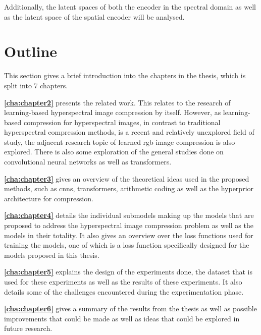 Additionally, the latent spaces of both the encoder in the spectral domain as well as the latent space of the spatial encoder will be analysed.

\section{Outline\label{sec:outline}}
This section gives a brief introduction into the chapters in the thesis, which is split into 7 chapters.

\textbf{\autoref{cha:chapter2}} presents the related work. This relates to the research of learning-based hyperspectral image compression by itself. However, as learning-based compression for hyperspectral images, in contrast to traditional hyperspectral compression methods, is a recent and relatively unexplored field of study, the adjacent research topic of learned \ac{rgb} image compression is also explored. There is also some exploration of the general studies done on convolutional neural networks as well as transformers.

\textbf{\autoref{cha:chapter3}} gives an overview of the theoretical ideas used in the proposed methods, such as \acp{cnn}, transformers, arithmetic coding as well as the hyperprior architecture for compression.

\textbf{\autoref{cha:chapter4}} details the individual submodels making up the models that are proposed to address the hyperspectral image compression problem as well as the models in their totality. It also gives an overview over the loss functions used for training the models, one of which is a loss function specifically designed for the models proposed in this thesis.

\textbf{\autoref{cha:chapter5}} explains the design of the experiments done, the dataset that is used for these experiments as well as the results of these experiments. It also details some of the challenges encountered during the experimentation phase.

\textbf{\autoref{cha:chapter6}} gives a summary of the results from the thesis as well as possible improvements that could be made as well as ideas that could be explored in future research.